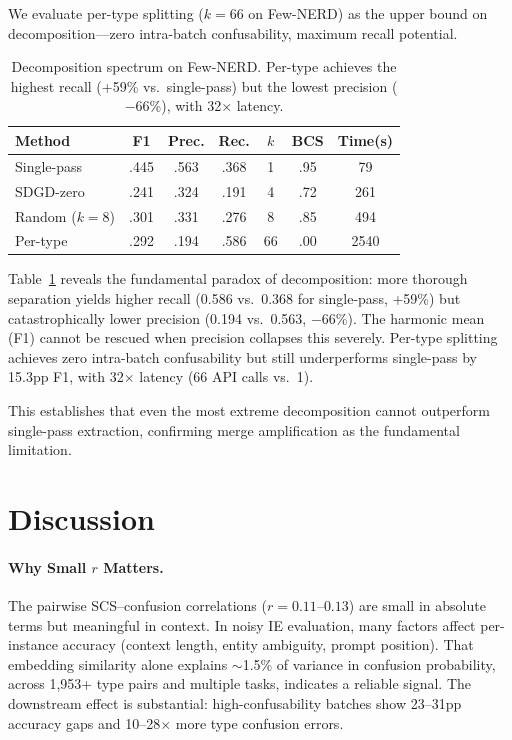 \documentclass[11pt,a4paper]{article}
\begin{document}
We evaluate per-type splitting ($k{=}66$ on Few-NERD) as the upper bound on decomposition---zero intra-batch confusability, maximum recall potential.

\begin{table}[t]
\centering
\small
\begin{tabular}{lcccccc}
\toprule
\textbf{Method} & \textbf{F1} & \textbf{Prec.} & \textbf{Rec.} & \textbf{$k$} & \textbf{BCS} & \textbf{Time(s)} \\
\midrule
Single-pass    & .445 & .563 & .368 & 1  & .95 & 79 \\
SDGD-zero      & .241 & .324 & .191 & 4  & .72 & 261 \\
Random ($k{=}8$) & .301 & .331 & .276 & 8  & .85 & 494 \\
Per-type       & .292 & .194 & .586 & 66 & .00 & 2540 \\
\bottomrule
\end{tabular}
\caption{Decomposition spectrum on Few-NERD. Per-type achieves the highest recall (+59\% vs.\ single-pass) but the lowest precision ($-$66\%), with 32$\times$ latency.}
\label{tab:per-type}
\end{table}

Table~\ref{tab:per-type} reveals the fundamental paradox of decomposition: more thorough separation yields higher recall (0.586 vs.\ 0.368 for single-pass, +59\%) but catastrophically lower precision (0.194 vs.\ 0.563, $-$66\%).
The harmonic mean (F1) cannot be rescued when precision collapses this severely.
Per-type splitting achieves zero intra-batch confusability but still underperforms single-pass by 15.3pp F1, with 32$\times$ latency (66 API calls vs.\ 1).

This establishes that even the most extreme decomposition cannot outperform single-pass extraction, confirming merge amplification as the fundamental limitation.

\section{Discussion}

\paragraph{Why Small $r$ Matters.}
The pairwise SCS--confusion correlations ($r{=}0.11$--$0.13$) are small in absolute terms but meaningful in context.
In noisy IE evaluation, many factors affect per-instance accuracy (context length, entity ambiguity, prompt position).
That embedding similarity alone explains $\sim$1.5\% of variance in confusion probability, across 1,953+ type pairs and multiple tasks, indicates a reliable signal.
The downstream effect is substantial: high-confusability batches show 23--31pp accuracy gaps and 10--28$\times$ more type confusion errors.
\end{document}

